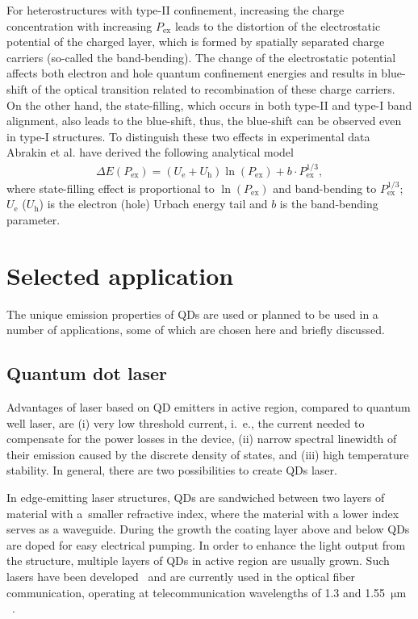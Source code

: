 \documentclass[
a4paper, %
11pt, %
onecolumn, %
openany, %
oldfontcommands,
]{memoir}
\begin{document}
For heterostructures with type-II confinement, increasing the charge concentration with increasing $P_\mathrm{ex}$ leads to the distortion of the electrostatic potential of the charged layer, which is formed by spatially separated charge carriers (so-called the band-bending). The change of the electrostatic potential affects both electron and hole quantum confinement energies and results in blue-shift of the optical transition related to recombination of these charge carriers. On the other hand, the state-filling, which occurs in both type-II and type-I band alignment, also leads to the blue-shift, thus, the blue-shift can be observed even in type-I structures. To distinguish these two effects in experimental data Abrakin et al. have derived the following analytical model~\cite{Abramkin_blueshift_analytical}
\begin{eqnarray}
\Delta E\left(P_\mathrm{ex}\right)=\left(U_\mathrm{e}+U_\mathrm{h}\right)\ln\left(P_\mathrm{ex}\right) + b\cdot P_\mathrm{ex}^{1/3},
\end{eqnarray}
where state-filling effect is proportional to $\ln\left( P_\mathrm{ex} \right)$ and band-bending to $P_\mathrm{ex}^{1/3}$; $U_\mathrm{e}$ ($U_\mathrm{h}$) is the electron (hole) Urbach energy tail and $b$ is the band-bending parameter.




\section{Selected application}
The unique emission properties of QDs are used or planned to be used in a number of applications, some of which are chosen here and briefly discussed.
\subsection*{Quantum dot laser}
Advantages of laser based on QD emitters in active region, compared to quantum well laser, are (i) very low threshold current, i.~e., the current needed to compensate for the power losses in the device, (ii) narrow spectral linewidth of their emission caused by the discrete density of states, and (iii) high temperature stability. In general, there are two possibilities to create QDs laser.

In edge-emitting laser structures, QDs are sandwiched between two layers of material with a~smaller refractive index, where the material with a lower index serves as a waveguide. During the growth the coating layer above and below QDs are doped for easy electrical pumping. In order to enhance the light output from the structure, multiple layers of QDs in active region are usually grown. Such lasers have been developed~\cite{Kirstaedter,SellinAPL,SellinEL,Kovsh,Ledentsov} and are currently used in the optical fiber communication, operating at telecommunication wavelengths of 1.3 and 1.55~$\mathrm{\mu m}$~\cite{QDlaser}. 
\end{document}
